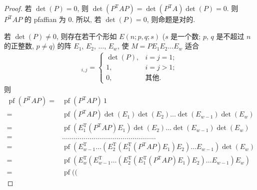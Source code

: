 \begin{proof}
    若 \(\det {(P)} = 0\),
    则 \(\det {(P^{\mathrm{T}} A P)}
    = \det {(P^{\mathrm{T}} A)} \det {(P)}
    = 0\).
    则 \(P^{\mathrm{T}} A P\) 的 pfaffian 为 \(0\).
    所以, 若 \(\det {(P)} = 0\),
    则命题是对的.

    若 \(\det {(P)} \neq 0\),
    则存在若干个形如 \(E(n; p, q; s)\)
    (\(s\) 是一个数;
    \(p\), \(q\) 是不超过 \(n\) 的正整数,
    \(p \neq q\))
    的阵
    \(E_1\), \(E_2\), \(\dots\), \(E_w\),
    使 \(M = P E_1 E_2 \dots E_w\)
    适合
    \begin{align*}
        [M]_{i,j} =
        \begin{cases}
            \det {(P)}, & i = j = 1; \\
            1,          & i = j > 1; \\
            0,          & \text{其他}.
        \end{cases}
    \end{align*}
    则
    \begin{align*}
        \operatorname{pf} {(P^{\mathrm{T}} A P)}
        = {} &
        \operatorname{pf} {(P^{\mathrm{T}} A P)}
        \, 1
        \\
        = {} &
        \operatorname{pf} {(P^{\mathrm{T}} A P)}
        \det {(E_1)}
        \det {(E_2)}
        \dots
        \det {(E_{w-1})}
        \det {(E_w)}
        \\
        = {} &
        \operatorname{pf}
        {(E_1^{\mathrm{T}} (P^{\mathrm{T}} A P) E_1)}
        \det {(E_2)}
        \dots
        \det {(E_{w-1})}
        \det {(E_w)}
        \\
        = {} &
        \dots \dots \dots \dots
        \dots \dots \dots \dots
        \dots \dots \dots \dots
        \dots \dots \dots \dots
        \\
        = {} &
        \operatorname{pf}
        {(
        E_{w-1}^{\mathrm{T}}
        \dots
        (E_2^{\mathrm{T}}
        (E_1^{\mathrm{T}}
        (P^{\mathrm{T}} A P)
        E_1)
        E_2)
        \dots
        E_{w-1}
        )}
        \det {(E_w)}
        \\
        = {} &
        \operatorname{pf}
        {(
        E_w^{\mathrm{T}}
        (E_{w-1}^{\mathrm{T}}
        \dots
        (E_2^{\mathrm{T}}
        (E_1^{\mathrm{T}}
        (P^{\mathrm{T}} A P)
        E_1)
        E_2)
        \dots
        E_{w-1})
        E_w
        )}
        \\
        = {} &
        \operatorname{pf}
        {(
        (
}
\end{align*}
\end{proof}
